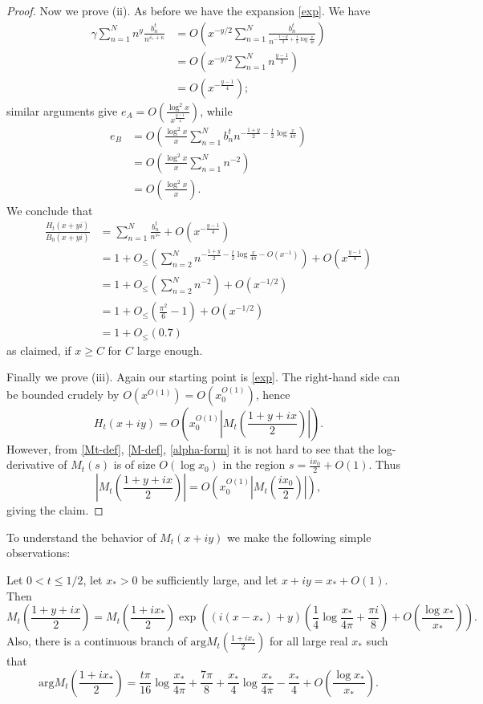 \begin{proof}
Now we prove (ii).  As before we have the expansion \eqref{exp}.  We have
\begin{align*}
\gamma \sum_{n=1}^N n^y \frac{b_n^t}{n^{\overline{s_*} + \kappa}} &= O\left( x^{-y/2} \sum_{n=1}^N \frac{b_n^t}{n^{-\frac{1-y}{2} + \frac{t}{2} \log \frac{x}{4\pi}}} \right) \\
&= O\left( x^{-y/2} \sum_{n=1}^N n^{\frac{y-1}{2}} \right) \\
&= O(x^{-\frac{y-1}{4}});
\end{align*}
similar arguments give $e_A = O( \frac{\log^2 x}{x^{\frac{y-1}{4}}} )$, while
\begin{align*}
e_B &= O\left( \frac{\log^2 x}{x} \sum_{n=1}^N b_n^t n^{-\frac{1+y}{2}-\frac{t}{2} \log \frac{x}{4\pi}} \right) \\
&= O\left( \frac{\log^2 x}{x} \sum_{n=1}^N n^{-2} \right) \\
&= O\left( \frac{\log^2 x}{x} \right).
\end{align*}
We conclude that
\begin{align*}
\frac{H_t(x+yi)}{B_0(x+yi)} &= \sum_{n=1}^N \frac{b_n^t}{n^{s_*}} + O( x^{-\frac{y-1}{4}} ) \\
&= 1 + O_{\leq}\left( \sum_{n=2}^N n^{-\frac{1+y}{2} - \frac{t}{2} \log \frac{x}{4\pi} - O(x^{-1})} \right) + O( x^{\frac{y-1}{4}} ) \\
&= 1 + O_{\leq}\left( \sum_{n=2}^N n^{-2} \right) + O( x^{-1/2}) \\
&= 1 + O_{\leq}\left( \frac{\pi^2}{6} - 1 \right) + O( x^{-1/2} ) \\
&= 1 + O_{\leq}( 0.7 )
\end{align*}
as claimed, if $x \geq C$ for $C$ large enough.

Finally we prove (iii).  Again our starting point is \eqref{exp}.  The right-hand side can be bounded crudely by $O( x^{O(1)}) = O(x_0^{O(1)})$, hence
$$ H_t(x+iy) = O( x_0^{O(1)} |M_t( \frac{1+y+ix}{2} )| ).$$
However, from \eqref{Mt-def}, \eqref{M-def}, \eqref{alpha-form} it is not hard to see that the log-derivative of $M_t(s)$ is of size $O( \log x_0 )$ in the region $s = \frac{ix_0}{2} + O(1)$.  Thus
$$ |M_t( \frac{1+y+ix}{2} )| = O( x_0^{O(1)} |M_t( \frac{ix_0}{2} )| ),$$
giving the claim.
\end{proof}

To understand the behavior of $M_t(x+iy)$ we make the following simple observations:

\begin{lemma}\label{mtform}  Let $0 < t \leq 1/2$, let $x_* > 0$ be sufficiently large, and let $x+iy = x_* + O(1)$.  Then
$$ M_t(\frac{1+y+ix}{2}) = M_t(\frac{1+ix_*}{2}) \exp\left( (i(x-x_*)+y) \left(\frac{1}{4} \log \frac{x_*}{4\pi} + \frac{\pi i}{8}\right) + O\left( \frac{\log x_*}{x_*}\right) \right).$$
Also, there is a continuous branch of $\mathrm{arg} M_t\left(\frac{1+ix_*}{2}\right)$ for all large real $x_*$ such that
$$ \mathrm{arg} M_t\left(\frac{1+ix_*}{2}\right) = \frac{t \pi}{16} \log \frac{x_*}{4\pi} + \frac{7\pi}{8} 
+ \frac{x_*}{4} \log \frac{x_*}{4\pi} - \frac{x_*}{4} + O( \frac{\log x_*}{x_*} ).$$
\end{lemma}

